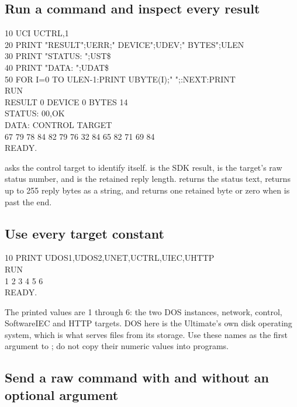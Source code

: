 \subsection*{Run a command and inspect every result}

\begin{screen}
10 UCI UCTRL,1\\
20 PRINT "RESULT";UERR;" DEVICE";UDEV;" BYTES";ULEN\\
30 PRINT "STATUS: ";UST\$\\
40 PRINT "DATA: ";UDAT\$\\
50 FOR I=0 TO ULEN-1:PRINT UBYTE(I);" ";:NEXT:PRINT\\
RUN\\
RESULT 0 DEVICE 0 BYTES 14\\
STATUS: 00,OK\\
DATA: CONTROL TARGET\\
67 79 78 84 82 79 76 32 84 65 82 71 69 84\\
READY.
\end{screen}

 asks the control target to identify itself.  is the
SDK result,  is the target's raw status number, and  is the
retained reply length.  returns the status text,  returns
up to 255 reply bytes as a string, and  returns one retained byte
or zero when  is past the end.

\subsection*{Use every target constant}

\begin{screen}
10 PRINT UDOS1,UDOS2,UNET,UCTRL,UIEC,UHTTP\\
RUN\\
1  2  3  4  5  6\\
READY.
\end{screen}

The printed values are 1 through 6: the two DOS instances, network, control,
SoftwareIEC and HTTP targets. DOS here is the Ultimate's own disk operating
system, which is what serves files from its storage. Use these names as the
first argument to ; do not copy their numeric values into programs.

\subsection*{Send a raw command with and without an optional argument}

